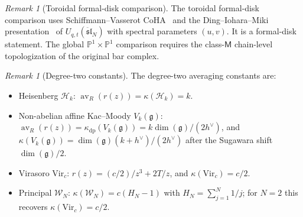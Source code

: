 \documentclass[11pt,reqno]{amsart}
\theoremstyle{definition}
\theoremstyle{remark}
\newtheorem{remark}[theorem]{Remark}
\newcommand{\cH}{\mathcal{H}}
\newcommand{\cW}{\mathcal{W}}
\newcommand{\fg}{\mathfrak{g}}
\newcommand{\Vir}{\mathrm{Vir}}
\newcommand{\av}{\operatorname{av}}
\numberwithin{equation}{section}
\begin{document}
\begin{remark}[Toroidal formal-disk comparison]
The toroidal formal-disk comparison uses Schiffmann--Vasserot
CoHA~\cite{SchiffmannVasserot13} and the Ding--Iohara--Miki
presentation~\cite{DingIohara97} of
$U_{q,t}(\ddot{\mathfrak{sl}}_N)$ with spectral parameters $(u,v)$.
It is a formal-disk statement. The global
$\mathbb{P}^1\times\mathbb{P}^1$ comparison requires the
class-$\mathsf{M}$ chain-level topologization of the original bar
complex.
\end{remark}

\begin{remark}[Degree-two constants]
The degree-two averaging constants are:
\begin{itemize}[leftmargin=1.8em]
\item Heisenberg $\cH_k$: $\av_R(r(z))=\kappa(\cH_k)=k$.
\item Non-abelian affine Kac--Moody $V_k(\fg)$:
$\av_R(r(z))=\kappa_{\mathrm{dp}}(V_k(\fg))
=k\dim(\fg)/(2h^\vee)$, and
$\kappa(V_k(\fg))=\dim(\fg)(k+h^\vee)/(2h^\vee)$ after the
Sugawara shift $\dim(\fg)/2$.
\item Virasoro $\Vir_c$:
$r(z)=(c/2)/z^3+2T/z$, and $\kappa(\Vir_c)=c/2$.
\item Principal $\cW_N$:
$\kappa(\cW_N)=c(H_N-1)$ with
$H_N=\sum_{j=1}^N 1/j$; for $N=2$ this recovers
$\kappa(\Vir_c)=c/2$.
\end{itemize}
\end{remark}
\end{document}
